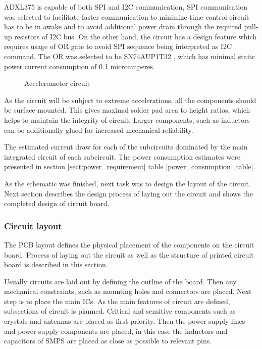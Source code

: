 ADXL375 is capable of both SPI and I2C communication, SPI communication was selected to facilitate faster communication to minimize time control circuit has to be in awake and to avoid additional power drain through the required pull-up resistors of I2C bus. On the other hand, the circuit has a design feature which requires usage of OR gate to avoid SPI sequence being interpreted as I2C command. The OR was selected to be SN74AUP1T32 \cite{orgate}, which has minimal static power current consumption of 0.1 microamperes. 

\begin{figure}
    \centering
    \def\svgwidth{\columnwidth}
    
    \caption{\label{fig:sensor_circuit} Accelerometer circuit}
\end{figure}

As the circuit will be subject to extreme accelerations, all the components should be surface mounted. This gives maximal solder pad area to height ratios, which helps to maintain the integrity of circuit. Larger components, such as inductors can be additionally glued for increased mechanical reliability.

The estimated current draw for each of the subcircuits dominated by the main integrated circuit of each subcircuit. The power consumption estimates were presented in section \ref{sect:power_requirement} table \ref{power_consumption_table}.

As the schematic was finished, next task was to design the layout of the circuit. Next section describes the design process of laying out the circuit and shows the completed design of circuit board.

\subsubsection{Circuit layout}
The PCB layout defines the physical placement of the components on the circuit board. Process of laying out the circuit as well as the structure of printed circuit board is described in this section.

Usually circuits are laid out by defining the outline of the board. Then any mechanical constraints, such as mounting holes and connectors are placed. Next step is to place the main ICs. As the main features of circuit are defined, subsections of circuit is planned. Critical and sensitive components such as crystals and antennas are placed as first priority. Then the power supply lines and power supply components are placed, in this case the inductors and capacitors of SMPS are placed as close as possible to relevant pins. 

